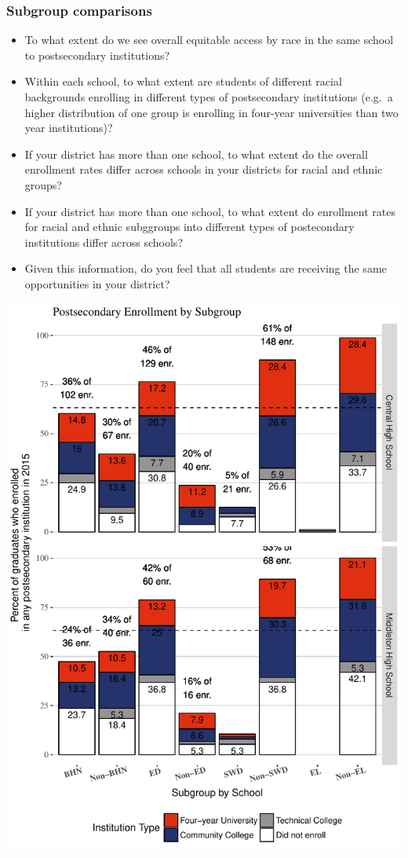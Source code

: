 \documentclass[11pt,]{article}
\providecommand{\tightlist}{%
  \setlength{\itemsep}{0pt}\setlength{\parskip}{0pt}}
\begin{document}
\subsubsection{Subgroup comparisons}\label{subgroup-comparisons}

\begin{itemize}
\tightlist
\item
  To what extent do we see overall equitable access by race in the same
  school to postsecondary institutions?
\item
  Within each school, to what extent are students of different racial
  backgrounds enrolling in different types of postsecondary institutions
  (e.g.~a higher distribution of one group is enrolling in four-year
  universities than two year institutions)?
\item
  If your district has more than one school, to what extent do the
  overall enrollment rates differ across schools in your districts for
  racial and ethnic groups?
\item
  If your district has more than one school, to what extent do
  enrollment rates for racial and ethnic subggroups into different types
  of postecondary institutions differ across schools?
\item
  Given this information, do you feel that all students are receiving
  the same opportunities in your district?
\end{itemize}

\begin{center}\includegraphics{20170517_PSWRR_files/figure-latex/subgroup_enrollment-1} \end{center}
\end{document}

